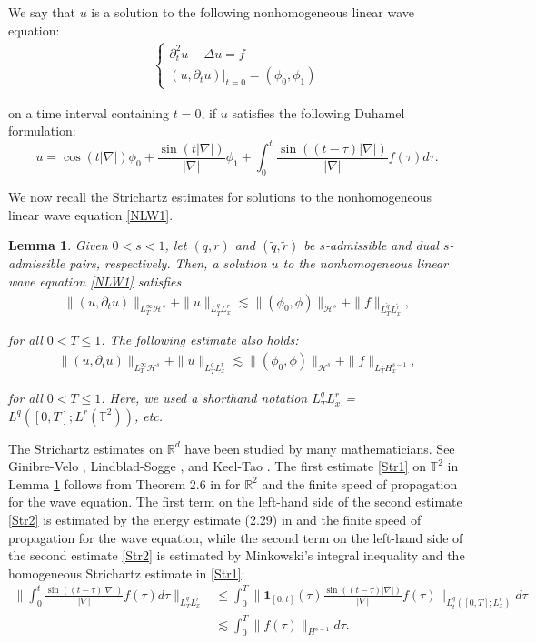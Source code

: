 \documentclass[letterpaper, 11pt,  reqno]{amsart}
\newtheorem{lemma}[theorem]{Lemma}
\newcommand{\1}{\hspace{0.5mm}\text{I}\hspace{0.5mm}}
\newcommand{\noi}{\noindent}
\newcommand{\R}{\mathbb{R}}
\newcommand{\T}{\mathbb{T}}
\newcommand{\nb}{\nabla}
\newcommand{\wt}{\widetilde}
\newcommand{\dt}{\partial_t}
\newcommand{\les}{\lesssim}
\newcommand{\ind}{\mathbf 1}
\renewcommand{\H}{\mathcal{H}}
\numberwithin{equation}{section}
\numberwithin{theorem}{section}
\begin{document}
We say that  $u$ is a solution to the following nonhomogeneous linear wave equation:
\begin{align}
\begin{cases}
\dt^2 u -\Delta u = f \\
( u, \dt u) |_{t = 0}=(\phi_0,  \phi_1) 
\end{cases}
\label{NLW1}
\end{align}


\noi
on a time interval containing $t= 0$, 
if $u$ satisfies the following Duhamel formulation:
\[ u =  \cos (t|\nb|) \phi_0 +   \frac{\sin (t|\nb|)}{ |\nb|} \phi_1 
+ \int_0^t  \frac{\sin ((t-\tau)|\nb|)}{ |\nb|}   f(\tau) d\tau . \]  

\noi
We now recall the  Strichartz estimates
for solutions to the nonhomogeneous linear wave equation
\eqref{NLW1}.



\begin{lemma}\label{LEM:Str}
Given $0 < s < 1$,
let $(q, r)$ and $(\wt q,\wt r)$
be $s$-admissible and dual $s$-admissible pairs, respectively. 
Then, a solution $u$ to the nonhomogeneous linear wave equation \eqref{NLW1}
satisfies
\begin{align}
\| (u, \dt u) \|_ {L^\infty_T \H^s } + 
 \| u  \|_{L^q_TL^r_x}
\lesssim 
\|(\phi_0, \phi) \|_{\H^s}  +  \| f \|_{L^{\wt q}_TL^{\wt r}_x},
\label{Str1}
\end{align}

\noi
for all $0 < T \leq 1$. 
The following estimate also holds:
\begin{align}
\| (u, \dt u) \|_ {L^\infty_T \H^s } 
+  \| u  \|_{L^q_TL^r_x}
\lesssim 
\|(\phi_0, \phi) \|_{\H^s}  +  \| f \|_{L^{1}_T H^{s-1}_x},
\label{Str2}
\end{align}

\noi
for all $0 < T \leq 1$.
Here, we used a shorthand notation
$L^q_TL^r_x$ = $L^q([0, T]; L^r(\T^2))$, etc.
\end{lemma}


The Strichartz estimates on $\R^d$ have been studied by many
mathematicians.  See Ginibre-Velo \cite{GV}, Lindblad-Sogge \cite{LS},
and Keel-Tao \cite{KeelTao}. 
 The first estimate \eqref{Str1} on $\T^2$ in Lemma \ref{LEM:Str} follows
from  Theorem 2.6 in 
\cite{TAO} for $\R^2$ 
and   the finite speed of propagation for the wave equation.
The first term on the left-hand side of  the second estimate \eqref{Str2} 
is estimated by   the energy estimate (2.29) in \cite{TAO}
and   the finite speed of propagation for the wave equation, 
while 
the second term on the left-hand side of the second estimate \eqref{Str2} 
is estimated by   Minkowski's integral inequality
and the homogeneous Strichartz estimate  in \eqref{Str1}: 
\begin{align*}
 \bigg\| \int_0^t \frac{\sin((t-\tau)|\nb|)}{|\nb|}f(\tau)d\tau  \bigg\|_{L^q_TL^r_x}  
&  \le   \int_0^T  \bigg\| \ind_{[0, t]}(\tau) \frac{\sin((t-\tau)|\nb|)}{|\nb|} f(\tau) \bigg\|_{L^q_t([0, T]; L^r_x)} d\tau
\\ 
& \les   \int_0^T \| f(\tau) \|_{H^{s-1}} d\tau. 
\end{align*}
\end{document}
